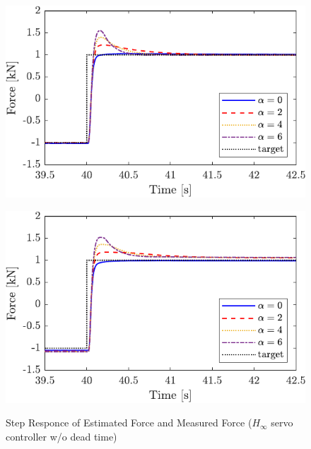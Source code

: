 \begin{figure}[t]
    \begin{minipage}{\minipageratio\hsize}
    \centering
        \includegraphics[keepaspectratio, scale = \minifigscale]{contents/ForceControl/figure/1115/crop-1115_JFPSHinf_estforce_step.pdf}
        \label{fig4:crop-1115_JFPSHinf_estforce_step}
    \end{minipage}
    \begin{minipage}{\minipageratio\hsize}
    \centering
        \includegraphics[keepaspectratio, scale = \minifigscale]{contents/ForceControl/figure/1115/crop-1115_JFPSHinf_force_step.pdf}
        \label{fig4:crop-1115_JFPSHinf_force_step}
    \end{minipage}
    \caption{Step Responce of Estimated Force and Measured Force ($H_\infty$ servo controller w/o dead time)}   
    \label{fig4:crop-1115_JFPSHinf_step}
\end{figure}
